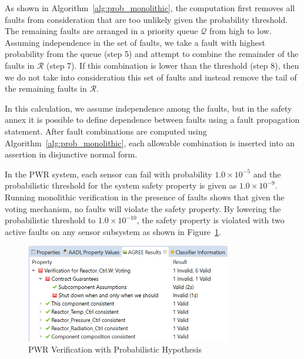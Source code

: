 As shown in Algorithm~\ref{alg:prob_monolithic}, the computation first removes all faults from consideration that are too unlikely given the probability threshold. The remaining faults are arranged in a priority queue $\mathcal{Q}$ from high to low. Assuming independence in the set of faults, we take a fault with highest probability from the queue (step 5) and attempt to combine the remainder of the faults in $\mathcal{R}$ (step 7). If this combination is lower than the threshold (step 8), then we do not take into consideration this set of faults and instead remove the tail of the remaining faults in $\mathcal{R}$. 
 
In this calculation, we assume independence among the faults, but in the safety annex it is possible to define dependence between faults using a fault propagation statement. After fault combinations are computed using Algorithm~\ref{alg:prob_monolithic}, each allowable combination is inserted into an assertion in disjunctive normal form. 

In the PWR system, each sensor can fail with probability $1.0 \times 10^{-5}$ and the probabilistic threshold for the system safety property is given as $1.0 \times 10^{-9}$. Running monolithic verification in the presence of faults shows that given the voting mechanism, no faults will violate the safety property. By lowering the probabilistic threshold to $1.0 \times 10^{-10}$, the safety property is violated with two active faults on any sensor subsystem as shown in Figure~\ref{fig:probPWRVerif}.

\begin{figure}[h!]
		\includegraphics[width=0.8\textwidth]{images/probPWRVerif.png}
	\caption{PWR Verification with Probabilistic Hypothesis}
	\label{fig:probPWRVerif}
\end{figure}

